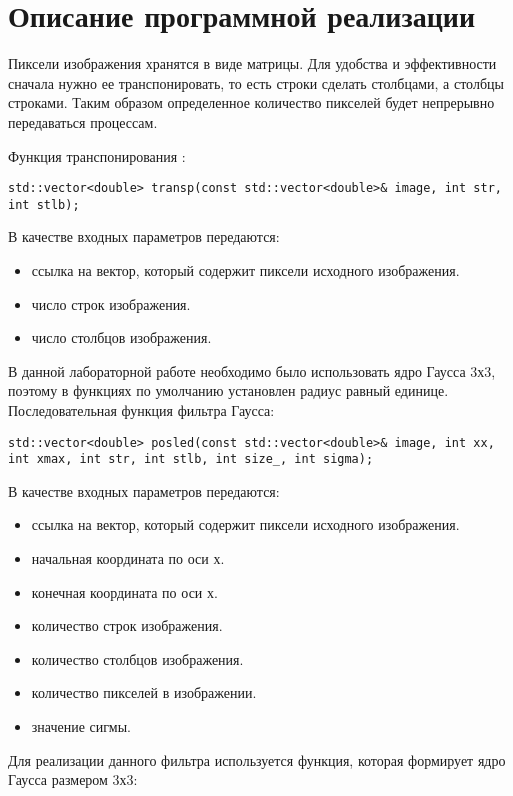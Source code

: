 \documentclass{report}
\begin{document}
\section*{Описание программной реализации}
Пиксели изображения хранятся в виде матрицы. Для удобства и эффективности сначала нужно ее транспонировать, то есть строки сделать столбцами, а столбцы строками. Таким образом определенное количество пикселей будет непрерывно передаваться процессам.
\par Функция транспонирования :
\begin{lstlisting}
std::vector<double> transp(const std::vector<double>& image, int str, int stlb);
\end{lstlisting}
\par В качестве входных параметров передаются:
\begin{itemize}
\item ссылка на вектор, который содержит пиксели исходного изображения.
\item число строк изображения.
\item число столбцов изображения.
\end{itemize}
\par В данной лабораторной работе необходимо было использовать ядро Гаусса 3х3, поэтому в функциях по умолчанию установлен радиус равный единице. Последовательная функция фильтра Гаусса:
\begin{lstlisting}
std::vector<double> posled(const std::vector<double>& image, int xx, int xmax, int str, int stlb, int size_, int sigma);
\end{lstlisting}
\par В качестве входных параметров передаются:
\begin{itemize}
\item ссылка на вектор, который содержит пиксели исходного изображения.
\item начальная координата по оси х.
\item конечная координата по оси х.
\item количество строк изображения.
\item количество столбцов изображения.
\item количество пикселей в изображении.
\item значение сигмы.
\end{itemize}
\par Для реализации данного фильтра используется функция, которая формирует ядро Гаусса размером 3х3:
\end{document}
